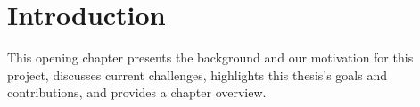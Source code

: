 \chapter{Introduction}
\label{chap:introduction}

This opening chapter presents the background and our motivation for this project, discusses current challenges, highlights this thesis's goals and contributions, and provides a chapter overview.


%


